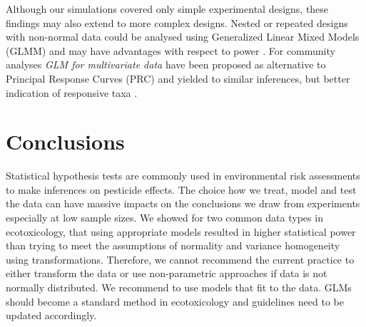 \documentclass{scrartcl}
\begin{document}
Although our simulations covered only simple experimental designs, these findings may also extend to more complex designs. 
Nested or repeated designs with non-normal data could be analysed using Generalized Linear Mixed Models (GLMM) and may have advantages with respect to power \citep{stroup_rethinking_2014}.
For community analyses \emph{GLM for multivariate data} have been proposed as alternative to Principal Response Curves (PRC) and yielded to similar inferences, but better indication of responsive taxa \citep{warton_distance-based_2012,szocs_analysing_2015}.



\section{Conclusions}
\label{sec:concl}
Statistical hypothesis tests are commonly used in environmental risk assessments  to make inferences on pesticide effects.
The choice how we treat, model and test the data can have massive impacts on the conclusions we draw from experiments especially at low sample sizes.
We showed for two common data types in ecotoxicology, that using appropriate models resulted in higher statistical power than trying to meet the assumptions of normality and variance homogeneity using transformations. 
Therefore, we cannot recommend the current practice to either transform the data or use non-parametric approaches if data is not normally distributed.
We recommend to use models that fit to the data. 
GLMs should become a standard method in ecotoxicology and guidelines need to be updated accordingly.





\end{document}
